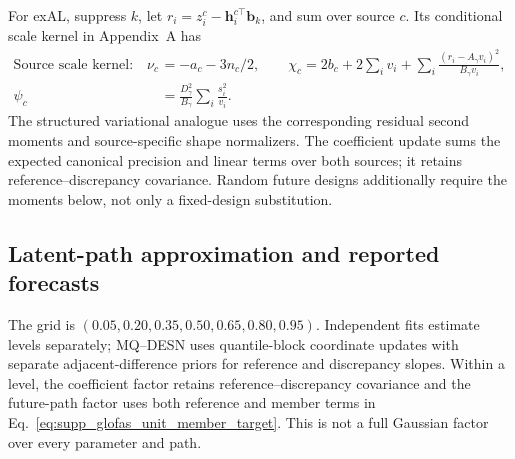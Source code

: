 \documentclass[12pt,letterpaper]{article}
\newcommand{\vect}[1]{\bm{#1}}
\numberwithin{suppalgorithm}{section}
\numberwithin{equation}{section}
\numberwithin{table}{section}
\numberwithin{figure}{section}
\begin{document}
For exAL, suppress \(k\), let
\(r_i=z_i^c-\vect h_i^{c\top}\vect b_k\), and sum over source
\(c\). Its conditional scale kernel in Appendix~A has
\begin{equation}
\begin{aligned}
\text{Source scale kernel:}\quad
\nu_c&=-a_c-3n_c/2,\qquad
\chi_c=2b_c+2\sum_i v_i+
\sum_i\frac{(r_i-A_\gamma v_i)^2}{B_\gamma v_i},\\
\psi_c&=\frac{D_\gamma^2}{B_\gamma}\sum_i\frac{s_i^2}{v_i}.
\end{aligned}
\label{eq:supp_glofas_unit_exal_updates}
\end{equation}
The structured variational analogue uses the corresponding residual
second moments and source-specific shape normalizers. The coefficient
update sums the expected canonical precision and linear terms over both
sources; it retains reference--discrepancy covariance. Random future
designs additionally require the moments below, not only a fixed-design
substitution.

\subsection{Latent-path approximation and reported forecasts}
\label{subsec:glofas_latent_path}

The grid is \((0.05,0.20,0.35,0.50,0.65,0.80,0.95)\).
Independent fits estimate levels separately; MQ--DESN uses quantile-block
coordinate updates with separate adjacent-difference priors for reference
and discrepancy slopes. Within a level, the coefficient factor retains
reference--discrepancy covariance and the future-path factor uses both
reference and member terms in Eq.~\eqref{eq:supp_glofas_unit_member_target}.
This is not a full Gaussian factor over every parameter and path.
\end{document}

